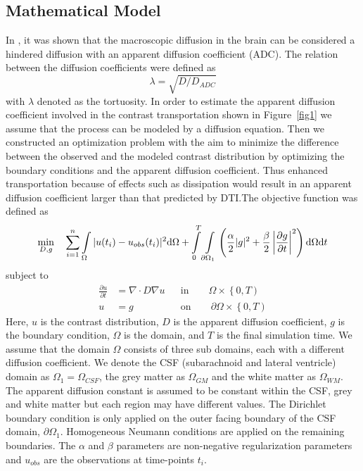 \documentclass[12pt,a4paper]{article}
\newcommand{\lars}[1]{\textcolor{magenta}{#1}}
\begin{document}
\subsection{Mathematical Model}
In \citet{sykova2008diffusion}, it was shown that the macroscopic diffusion in the brain can be considered a hindered diffusion with an apparent diffusion coefficient (ADC). The relation between the diffusion coefficients were defined as 
\begin{equation}
 \lambda =  \sqrt {D/D_{ADC}}
\label{tortuosity}
\end{equation}
with $\lambda$ denoted as the tortuosity.
In order to estimate the apparent diffusion coefficient involved in the contrast transportation shown in Figure~\ref{fig1} we assume that the process can be modeled by a diffusion equation. 
Then we constructed an optimization problem with the aim to minimize the difference between the observed and the modeled contrast distribution by optimizing the boundary conditions and the apparent diffusion coefficient.%
Thus enhanced transportation because of effects such as dissipation would result in an apparent diffusion coefficient larger than that predicted by DTI.The objective function was defined as 
\begin{equation}
\min_{D,g} \quad \sum\limits_{i=1}\sp{n} \int\limits_{\Omega} |u(t_i) - u_{obs}(t_i)|\sp{2} \mathrm{d}\Omega + \int\limits_{0}\sp{T} \int\limits_{\partial \Omega_1} \left( \frac{\alpha}{2} | g |\sp{2} + \frac{\beta}{2} \left| \frac{\partial g}{\partial t} \right|\sp{2} \right) \mathrm{d}\Omega \mathrm{d}t  
\label{EQ::objf}
\end{equation}
subject to   
\begin{equation}
\begin{aligned}
\frac{\partial u}{\partial t} &= \nabla \cdot  D \nabla u && \text{in} \qquad \Omega \times \left\lbrace 0 , T \right)  \\
u&=g && \text{on} \qquad \partial\Omega  \times \left\lbrace 0 , T \right) 
\end{aligned}
\label{Eq::PDE}
\end{equation}
Here, $u$ is the contrast distribution, $D$ is the apparent diffusion 
coefficient, $g$ is the boundary condition, $\Omega$ is the domain, and $T$ is the final simulation time. We assume that the domain $\Omega$ consists of three sub domains, each with a different diffusion coefficient. We denote the CSF (subarachnoid and lateral ventricle) domain as $\Omega_1=\Omega_{CSF}$, the grey matter as $\Omega_{GM}$ and the white matter as $\Omega_{WM}$. 
The apparent
diffusion constant is assumed to be constant within the CSF, grey and 
white matter but each region may have different values.  
The Dirichlet boundary condition is only applied on the outer facing boundary of the CSF domain, $\partial \Omega_1$. Homogeneous Neumann conditions are applied on the remaining boundaries.
The $\alpha$ and $\beta$ parameters are non-negative regularization parameters 
and $u_{obs}$ are the observations at time-points $t_i$. 
\end{document}
